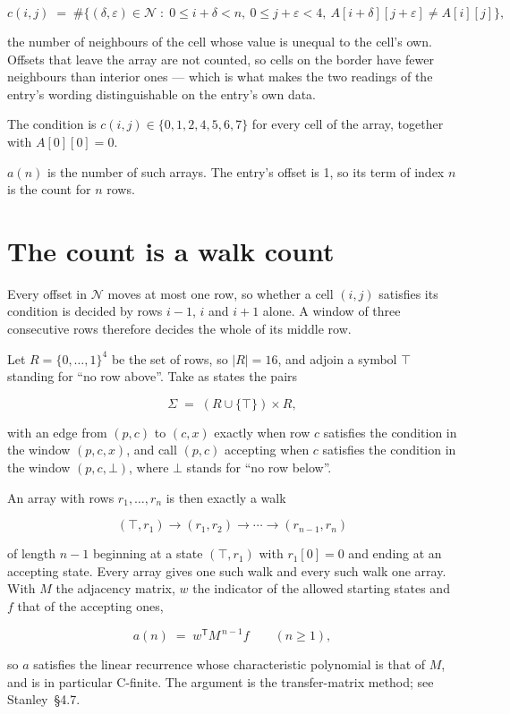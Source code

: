 \documentclass[11pt]{article}
\theoremstyle{definition}
\begin{document}
\[c(i,j) \;=\; \#\bigl\{(\delta,\varepsilon)\in\mathcal{N} \;:\; 0\le i+\delta<n,\ 0\le j+\varepsilon<4,\ A[i+\delta][j+\varepsilon] \neq A[i][j]\bigr\},\]

the number of neighbours of the cell whose value is unequal to the cell's own. Offsets that leave the array are not counted, so cells on the border have fewer neighbours than interior ones --- which is what makes the two readings of the entry's wording distinguishable on the entry's own data.

The condition is $c(i,j) \in \{0, 1, 2, 4, 5, 6, 7\}$ for every cell of the array, together with $A[0][0]=0$.

$a(n)$ is the number of such arrays. The entry's offset is 1, so its term of index $n$ is the count for $n$ rows.

\section{The count is a walk count}

Every offset in $\mathcal{N}$ moves at most one row, so whether a cell $(i,j)$ satisfies its condition is decided by rows $i-1$, $i$ and $i+1$ alone. A window of three consecutive rows therefore decides the whole of its middle row.

Let $R = \{0,\dots,1\}^{4}$ be the set of rows, so $|R| = 16$, and adjoin a symbol $\top$ standing for ``no row above''. Take as states the pairs

\[\Sigma \;=\; (R \cup \{\top\}) \times R,\]

with an edge from $(p,c)$ to $(c,x)$ exactly when row $c$ satisfies the condition in the window $(p,c,x)$, and call $(p,c)$ accepting when $c$ satisfies the condition in the window $(p,c,\bot)$, where $\bot$ stands for ``no row below''.

An array with rows $r_1,\dots,r_n$ is then exactly a walk

\[(\top,r_1) \to (r_1,r_2) \to \cdots \to (r_{n-1},r_n)\]

of length $n-1$ beginning at a state $(\top,r_1)$ with $r_1[0]=0$ and ending at an accepting state. Every array gives one such walk and every such walk one array. With $M$ the adjacency matrix, $w$ the indicator of the allowed starting states and $f$ that of the accepting ones,

\[a(n) \;=\; w^{\mathsf T} M^{\,n-1} f \qquad (n \ge 1),\]

so $a$ satisfies the linear recurrence whose characteristic polynomial is that of $M$, and is in particular C-finite. The argument is the transfer-matrix method; see Stanley~\S4.7.
\end{document}

